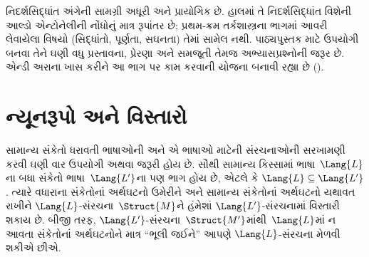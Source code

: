 
\label{guunit:OLP-0182}


\begin{editorial}
  નિદર્શસિદ્ધાંત અંગેની સામગ્રી અધૂરી અને પ્રાયોગિક છે. હાલમાં તે
  નિદર્શસિદ્ધાંત વિશેની આલ્ડો એન્ટોનેલીની નોંધોનું માત્ર રૂપાંતર છે;
  પ્રથમ-ક્રમ તર્કશાસ્ત્રના ભાગમાં આવરી લેવાયેલા વિષયો (સિદ્ધાંતો,
  પૂર્ણતા, સઘનતા) તેમાં સામેલ નથી. પાઠ્યપુસ્તક માટે ઉપયોગી બનવા તેને
  ઘણી વધુ પ્રસ્તાવના, પ્રેરણા અને સમજૂતી તેમજ અભ્યાસપ્રશ્નોની જરૂર છે.
  એન્ડી અરાના ખાસ કરીને આ ભાગ પર કામ કરવાની યોજના બનાવી રહ્યા છે
  ().
\end{editorial}

\begingroup
\makeatletter{}\makeatother

\label{guunit:OLP-0183}


\begingroup
\makeatletter{}\makeatother

\section{ન્યૂનરૂપો અને વિસ્તારો}
\label{guunit:OLP-0184}


સામાન્ય સંકેતો ધરાવતી ભાષાઓની અને એ ભાષાઓ માટેની સંરચનાઓની
સરખામણી કરવી ઘણી વાર ઉપયોગી અથવા જરૂરી હોય છે. સૌથી સામાન્ય કિસ્સામાં
ભાષા~$\Lang{L}$ના બધા સંકેતો ભાષા~$\Lang{L'}$ના પણ
ભાગ હોય છે, એટલે કે $\Lang{L} \subseteq \Lang{L'}$. ત્યારે વધારાના
સંકેતોનાં અર્થઘટનો ઉમેરીને અને સામાન્ય સંકેતોનાં અર્થઘટનો યથાવત રાખીને
$\Lang{L}$-સંરચના~$\Struct{M}$ને હંમેશાં
$\Lang{L'}$-સંરચનામાં વિસ્તારી શકાય છે. બીજી તરફ,
$\Lang{L'}$-સંરચના~$\Struct{M'}$માંથી~$\Lang{L}$માં ન આવતા સંકેતોનાં
અર્થઘટનોને માત્ર ``ભૂલી જઈને'' આપણે $\Lang{L}$-સંરચના મેળવી શકીએ છીએ.

